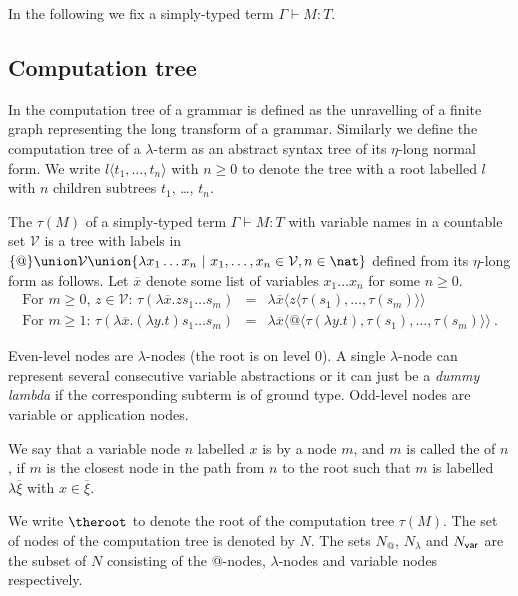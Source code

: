 In the following we fix a simply-typed term $\Gamma \vdash M :T$.

\subsection{Computation tree}
 In \cite{OngLics2006} the computation tree of a grammar is
defined as the unravelling of a finite graph representing the long transform of a grammar. Similarly we define the computation tree of a $\lambda$-term as an abstract syntax tree of its $\eta$-long normal form.  We write $l\langle t_1, \ldots, t_n \rangle$ with $n \geq 0$ to denote the tree with a root labelled $l$ with $n$ children subtrees $t_1$, \ldots, $t_n$.

\begin{definition}\rm
\label{dfn:comptree}
  The  $\tau(M)$ of a simply-typed term
  $\Gamma \vdash M:T$ with variable names in a countable set
  $\mathcal{V}$ is a tree with labels in $ \{ @ \} \union \mathcal{V}
  \union \{ \lambda x_1 \ldots x_n \ | \ x_1 ,\ldots, x_n \in
  \mathcal{V}, n\in\nat \}$ defined from its $\eta$-long form as follows.
  Let $\overline{x}$ denote some list of variables $x_1 \ldots x_n$ for some $n\geq 0$.
\begin{eqnarray*}
  \mbox{For $m\geq 0$, $z \in \mathcal{V}$: } \tau(\lambda \overline{x} . z s_1 \ldots s_m ) &=& \lambda \overline{x} \langle z \langle\tau(s_1),\ldots,\tau(s_m)\rangle\rangle \\
  \mbox{For $m \geq 1$: } \tau(\lambda \overline{x} . (\lambda y.t) s_1 \ldots s_m) &=& \lambda \overline{x} \langle @ \langle \tau(\lambda y.t),\tau(s_1),\ldots,\tau(s_m) \rangle \rangle \ .
\end{eqnarray*}
\end{definition}

Even-level nodes are $\lambda$-nodes (the root is on level 0). A single $\lambda$-node can represent several consecutive variable abstractions or it can just be a \emph{dummy lambda} if the corresponding subterm is of ground type.  Odd-level nodes are variable or application nodes.

We say that a variable node $n$ labelled $x$ is  by a node $m$, and $m$ is called the  of $n$, if $m$ is the closest node in the path from $n$ to the root such that $m$ is labelled $\lambda \overline{\xi}$ with $x\in \overline{\xi}$.


We write $\theroot$ to denote the root of the computation tree $\tau(M)$. The set of nodes of the computation tree is denoted by $N$. The sets $N_@$, $N_\lambda$ and $N_{\sf var}$ are the subset of $N$ consisting of the @-nodes, $\lambda$-nodes and variable nodes respectively.


